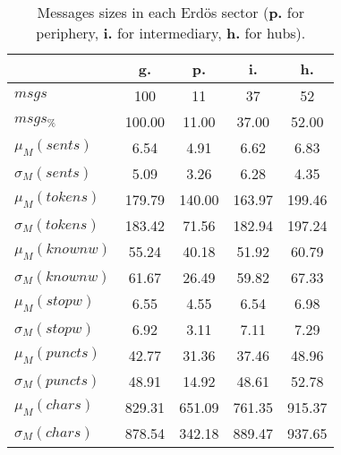 \begin{table}[h!]
\begin{center}
\begin{tabular}{| l || c | c | c | c |}\hline
 & {\bf g.} & {\bf p.} & {\bf i.} & {\bf h.} \\\hline\hline
$msgs$ & 100  & 11  & 37  & 52 \\
$msgs_{\%}$ & 100.00  & 11.00  & 37.00  & 52.00 \\\hline
$\mu_M(sents)$ & 6.54  & 4.91  & 6.62  & 6.83 \\
$\sigma_M(sents)$ & 5.09  & 3.26  & 6.28  & 4.35 \\\hline
$\mu_M(tokens)$ & 179.79  & 140.00  & 163.97  & 199.46 \\
$\sigma_M(tokens)$ & 183.42  & 71.56  & 182.94  & 197.24 \\\hline
$\mu_M(knownw)$ & 55.24  & 40.18  & 51.92  & 60.79 \\
$\sigma_M(knownw)$ & 61.67  & 26.49  & 59.82  & 67.33 \\\hline
$\mu_M(stopw)$ & 6.55  & 4.55  & 6.54  & 6.98 \\
$\sigma_M(stopw)$ & 6.92  & 3.11  & 7.11  & 7.29 \\\hline
$\mu_M(puncts)$ & 42.77  & 31.36  & 37.46  & 48.96 \\
$\sigma_M(puncts)$ & 48.91  & 14.92  & 48.61  & 52.78 \\\hline
$\mu_M(chars)$ & 829.31  & 651.09  & 761.35  & 915.37 \\
$\sigma_M(chars)$ & 878.54  & 342.18  & 889.47  & 937.65 \\\hline
\end{tabular}
\caption{Messages sizes in each Erd\"os sector ({{\bf p.}} for periphery, {{\bf i.}} for intermediary, {{\bf h.}} for hubs).}
\end{center}
\end{table}